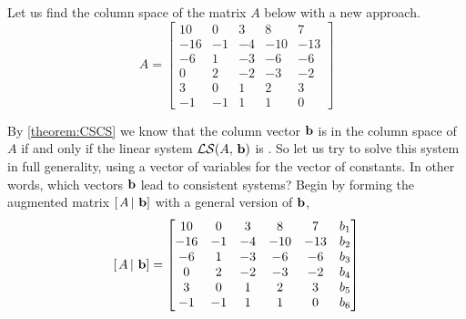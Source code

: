 \documentclass{ximera}
\begin{document}
\begin{example}

Let us find the column space of the matrix $A$ below with a new approach.
\[
A=
\begin{bmatrix}
 10 & 0 & 3 & 8 & 7 \\
 -16 & -1 & -4 & -10 & -13 \\
 -6 & 1 & -3 & -6 & -6 \\
 0 & 2 & -2 & -3 & -2 \\
 3 & 0 & 1 & 2 & 3 \\
 -1 & -1 & 1 & 1 & 0
\end{bmatrix}
\]

By \ref{theorem:CSCS} we know that the column vector $\mathbf{b}$ is in
the column space of $A$ if and only if the linear system
$\mathcal{LS}\!\left(A,\,\mathbf{b}\right)$ is
.  So
let us try to solve this system in full generality, using a vector of
variables for the vector of constants.  In other words, which vectors
$\mathbf{b}$ lead to consistent systems?  Begin by forming the augmented
matrix $\left\lbrack\left.A\,\right\rvert\,\mathbf{b}\right\rbrack$ with a general version of $\mathbf{b}$,
\[
\left\lbrack\left.A\,\right\rvert\,\mathbf{b}\right\rbrack=
\begin{bmatrix}
 10 & 0 & 3 & 8 & 7 & b_1 \\
 -16 & -1 & -4 & -10 & -13 & b_2 \\
 -6 & 1 & -3 & -6 & -6 & b_3 \\
 0 & 2 & -2 & -3 & -2 & b_4 \\
 3 & 0 & 1 & 2 & 3 & b_ 5\\
 -1 & -1 & 1 & 1 & 0 & b_ 6
\end{bmatrix}
\]


\end{example}
\end{document}
